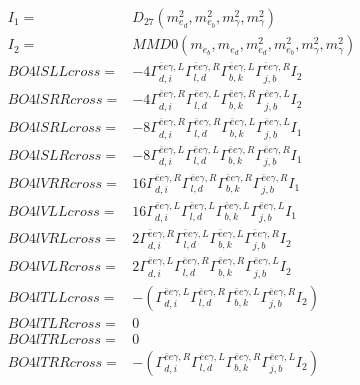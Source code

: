 \documentclass[A4,landscape]{article}
\begin{document}
\begin{align} 
I_1 = & D_{27}(m^2_{e_{{d}}}, m^2_{e_{{b}}}, m^2_{\gamma}, m^2_{\gamma}) \\ 
I_2 = & MMD0(m_{e_{{b}}}, m_{e_{{d}}}, m^2_{e_{{d}}}, m^2_{e_{{b}}}, m^2_{\gamma}, m^2_{\gamma}) \\ 
  BO4lSLLcross= & -4  \Gamma^{\bar{e}e \gamma ,L}_{d, i} \Gamma^{\bar{e}e \gamma ,R}_{l, d} \Gamma^{\bar{e}e \gamma ,L}_{b, k} \Gamma^{\bar{e}e \gamma ,R}_{j, b} I_2 \\ 
  BO4lSRRcross= & -4  \Gamma^{\bar{e}e \gamma ,R}_{d, i} \Gamma^{\bar{e}e \gamma ,L}_{l, d} \Gamma^{\bar{e}e \gamma ,R}_{b, k} \Gamma^{\bar{e}e \gamma ,L}_{j, b} I_2 \\ 
  BO4lSRLcross= & -8  \Gamma^{\bar{e}e \gamma ,R}_{d, i} \Gamma^{\bar{e}e \gamma ,R}_{l, d} \Gamma^{\bar{e}e \gamma ,L}_{b, k} \Gamma^{\bar{e}e \gamma ,L}_{j, b} I_1 \\ 
  BO4lSLRcross= & -8  \Gamma^{\bar{e}e \gamma ,L}_{d, i} \Gamma^{\bar{e}e \gamma ,L}_{l, d} \Gamma^{\bar{e}e \gamma ,R}_{b, k} \Gamma^{\bar{e}e \gamma ,R}_{j, b} I_1 \\ 
  BO4lVRRcross= & 16  \Gamma^{\bar{e}e \gamma ,R}_{d, i} \Gamma^{\bar{e}e \gamma ,R}_{l, d} \Gamma^{\bar{e}e \gamma ,R}_{b, k} \Gamma^{\bar{e}e \gamma ,R}_{j, b} I_1 \\ 
  BO4lVLLcross= & 16  \Gamma^{\bar{e}e \gamma ,L}_{d, i} \Gamma^{\bar{e}e \gamma ,L}_{l, d} \Gamma^{\bar{e}e \gamma ,L}_{b, k} \Gamma^{\bar{e}e \gamma ,L}_{j, b} I_1 \\ 
  BO4lVRLcross= & 2  \Gamma^{\bar{e}e \gamma ,R}_{d, i} \Gamma^{\bar{e}e \gamma ,L}_{l, d} \Gamma^{\bar{e}e \gamma ,L}_{b, k} \Gamma^{\bar{e}e \gamma ,R}_{j, b} I_2 \\ 
  BO4lVLRcross= & 2  \Gamma^{\bar{e}e \gamma ,L}_{d, i} \Gamma^{\bar{e}e \gamma ,R}_{l, d} \Gamma^{\bar{e}e \gamma ,R}_{b, k} \Gamma^{\bar{e}e \gamma ,L}_{j, b} I_2 \\ 
  BO4lTLLcross= & -( \Gamma^{\bar{e}e \gamma ,L}_{d, i} \Gamma^{\bar{e}e \gamma ,R}_{l, d} \Gamma^{\bar{e}e \gamma ,L}_{b, k} \Gamma^{\bar{e}e \gamma ,R}_{j, b} I_2) \\ 
  BO4lTLRcross= & 0 \\ 
  BO4lTRLcross= & 0 \\ 
  BO4lTRRcross= & -( \Gamma^{\bar{e}e \gamma ,R}_{d, i} \Gamma^{\bar{e}e \gamma ,L}_{l, d} \Gamma^{\bar{e}e \gamma ,R}_{b, k} \Gamma^{\bar{e}e \gamma ,L}_{j, b} I_2) \\ 
\end{align} 
\end{document}
